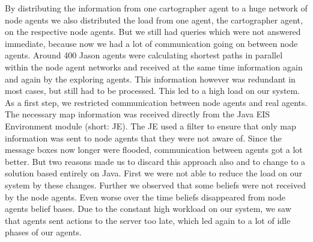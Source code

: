 By distributing the information from one cartographer agent to a huge network of node agents we also distributed the load from one agent, the cartographer agent, on the respective node agents.
But we still had queries which were not answered immediate, because now we had a lot of communication going on between node agents.
Around 400 Jason agents were calculating shortest paths in parallel within the node agent networks and received at the same time information again and again by the exploring agents.
This information however was redundant in most cases, but still had to be processed.
This led to a high load on our system.
As a first step, we restricted communication between node agents and real agents.
The necessary map information was received directly from the Java EIS Environment module (short: JE).
The JE used a filter to ensure that only map information was sent to node agents that they were not aware of.
Since the message boxes now longer were flooded, communication between agents got a lot better.
But two reasons made us to discard this approach also and to change to a solution based entirely on Java.
First we were not able to reduce the load on our system by these changes.
Further we observed that some beliefs were not received by the node agents.
Even worse over the time beliefs disappeared from node agents belief bases.
Due to the constant high workload on our system, we saw that agents sent actions to the server too late, which led again to a lot of idle phases of our agents.

